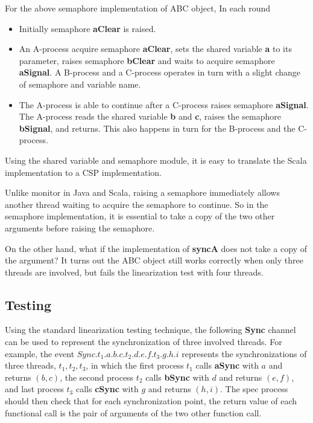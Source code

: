 \documentclass{article}
\begin{document}
For the above semaphore implementation of ABC object, In each round
\begin{itemize}
    \item Initially semaphore \textbf{aClear} is raised.
    \item An A-process acquire semaphore \textbf{aClear}, sets the shared variable \textbf{a} to its parameter, raises semaphore \textbf{bClear} and waits to acquire semaphore \textbf{aSignal}. A B-process and a C-process operates in turn with a slight change of semaphore and variable name.
    \item The A-process is able to continue after a C-process raises semaphore \textbf{aSignal}. The A-process reads the shared variable \textbf{b} and \textbf{c}, raises the semaphore \textbf{bSignal}, and returns. This also happens in turn for the B-process and the C-process.
\end{itemize}

Using the shared variable and semaphore module, it is easy to translate the Scala implementation to a CSP implementation.

Unlike monitor in Java and Scala, raising a semaphore immediately allows another thread waiting to acquire the semaphore to continue. So in the semaphore implementation, it is essential to take a copy of the two other arguments before raising the semaphore.

On the other hand, what if the implementation of \textbf{syncA} does not take a copy of the argument? It turns out the ABC object still works correctly when only three threads are involved, but fails the linearization test with four threads.

\subsection{Testing}
Using the standard linearization testing technique, the following \textbf{Sync} channel can be used to represent the synchronization of three involved threads. For example, the event $Sync.t_1.a.b.c.t_2.d.e.f.t_3.g.h.i$ represents the synchronizations of three threads, $t_1,t_2,t_3$, in which the first process $t_1$ calls \textbf{aSync} with $a$ and returns $(b,c)$, the second process $t_2$ calls \textbf{bSync} with $d$ and returns $(e,f)$, and last process $t_3$ calls \textbf{cSync} with $g$ and returns $(h,i)$. The spec process should then check that for each synchronization point, the return value of each functional call is the pair of arguments of the two other function call.
\end{document}
